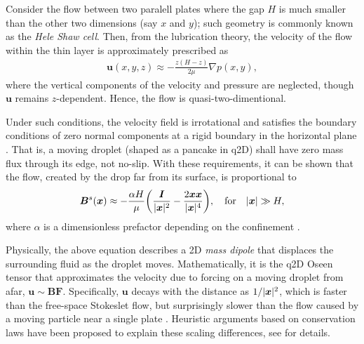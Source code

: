 \bigskip
Consider the flow between two paralell plates where the gap $H$ is much smaller than the other two dimensions (say $x$ and $y$); such geometry is commonly known as the \emph{Hele Shaw cell}. Then, from the lubrication theory, the velocity of the flow within the thin layer is approximately prescribed as 
 \begin{equation} \label{eq:hele-shaw}
  \begin{aligned}
    {\bm u}(x,y,z) \approx -\frac{z(H-z)}{2\mu} \nabla p(x,y),
  \end{aligned}
 \end{equation}
where the vertical components of the velocity and pressure are neglected, though ${\bm u}$ remains $z$-dependent. Hence, the flow is quasi-two-dimentional.

Under such conditions, the velocity field is irrotational and satisfies the boundary conditions of zero normal components at a rigid boundary in the horizontal plane \citep{Batchelor}. That is, a moving droplet (shaped as a pancake in q2D) shall have zero mass flux through its edge, not no-slip. With these requirements, it can be shown that the flow, created by the drop far from its surface, is proportional to
\begin{equation} \label{eq:dipolar}
 \begin{aligned}
   {\bm B}^s({\bm x}) \approx -\frac{\alpha H}{\mu} \bigg( \frac{{\bm I}}{\lvert\bm x\rvert^2} -\frac{ 2{\bm x}{\bm x} }{ \lvert{\bm x}\rvert^4} \bigg),
   \quad \textrm{for} \quad \lvert\bm x\rvert \gg H,
 \end{aligned}
\end{equation}
where $\alpha$ is a dimensionless prefactor depending on the confinement \citep{Diamant}.

Physically, the above equation describes a 2D \emph{mass dipole} that displaces the surrounding fluid as the droplet moves.
Mathematically, it is the q2D Oseen tensor that approximates the velocity due to forcing on a moving droplet from afar, \ie ${\bm u} \sim {\bm B}{\bm F}$.
Specifically, ${\bm u}$ decays with the distance as $1/\lvert\bm x\rvert^2$, which is faster than the free-space Stokeslet flow, but surprisingly slower than the flow caused by a moving particle near a single plate \citep{Cui2004}.
Heuristic arguments based on conservation laws have been proposed to explain these scaling differences, see \cite{Diamant} for details.

